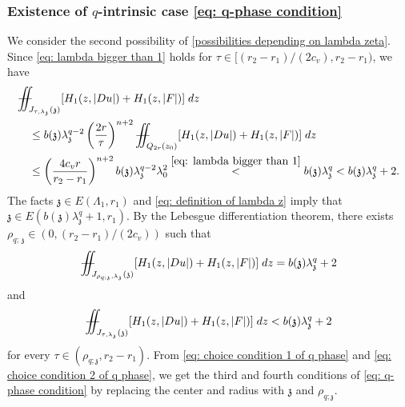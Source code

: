 \documentclass[11pt,oneside, english,reqno,twoside a4paper]{amsart}
\theoremstyle{definition}
\numberwithin{theorem}{section}
\numberwithin{equation}{section}
\newcommand{\iintss}{{\int\hspace{-0.28cm}\int}}
\newcommand{ \miints }{{\iintss\hspace{-0.56cm} -\hspace{-0.15cm}-}}
\newcommand{\miint}[1]{{\miints_{\hspace{-0.13cm}#1}}}
\begin{document}
\subsubsection{Existence of $q$-intrinsic case \eqref{eq: q-phase condition}} 
We consider the second possibility of \eqref{possibilities depending on lambda zeta}. Since \eqref{eq: lambda bigger than 1} holds for $\tau\in[(r_2-r_1)/(2c_v),r_2-r_1)$, we have 
\begin{align*}\nonumber
    &\miint{J_{\tau,\lambda_\mathfrak{z}}(\mathfrak{z})} [H_1(z,|Du|)+H_1(z,|F|)]\; dz\\ \nonumber
    &\quad \leq b(\mathfrak{z})\lambda_\mathfrak{z}^{q-2}\left(\frac{2r}{\tau}\right)^{n+2}\miint{Q_{2r}(z_0)} [H_1(z,|Du|)+H_1(z,|F|)]\; dz\\ \label{eq : basic inequality 1 in section 5}
    &\quad \leq \left(\frac{4c_v r}{r_2-r_1}\right)^{n+2} b(\mathfrak{z})\lambda_\mathfrak{z}^{q-2} \lambda_0^2 \overset{\eqref{eq: lambda bigger than 1}}{<}b(\mathfrak{z})\lambda_{\mathfrak{z}}^q<b(\mathfrak{z})\lambda_{\mathfrak{z}}^q+2.
\end{align*}
The facts $\mathfrak{z}\in E(\Lambda_1,r_1)$ and \eqref{eq: definition of lambda z} imply that $\mathfrak{z}\in E(b(\mathfrak{z})\lambda_\mathfrak{z}^q+1,r_1)$. By the Lebesgue differentiation theorem, there exists $\rho_{q; \, \mathfrak{z}}\in (0,(r_2-r_1)/(2c_v))$ such that 
\begin{equation}    \label{eq: choice condition 1 of q phase}
    \miint{J_{\rho_{q; \mathfrak{z}},\lambda_\mathfrak{z}}(\mathfrak{z})} [H_1(z,|Du|)+H_1(z,|F|)]\; dz=b(\mathfrak{z})\lambda_\mathfrak{z}^q+2
\end{equation}
and
\begin{equation}    \label{eq: choice condition 2 of q phase}
    \miint{J_{\tau,\lambda_\mathfrak{z}}(\mathfrak{z})} [H_1(z,|Du|)+H_1(z,|F|)]\; dz< b(\mathfrak{z})\lambda_\mathfrak{z}^q+2
\end{equation}
for every $\tau\in(\rho_{q; \mathfrak{z}},r_2-r_1).$ From \eqref{eq: choice condition 1 of q phase} and \eqref{eq: choice condition 2 of q phase}, we get the third and fourth conditions of \eqref{eq: q-phase condition} by replacing the center and radius with $\mathfrak{z}$ and $\rho_{q; \mathfrak{z}}.$
\end{document}
